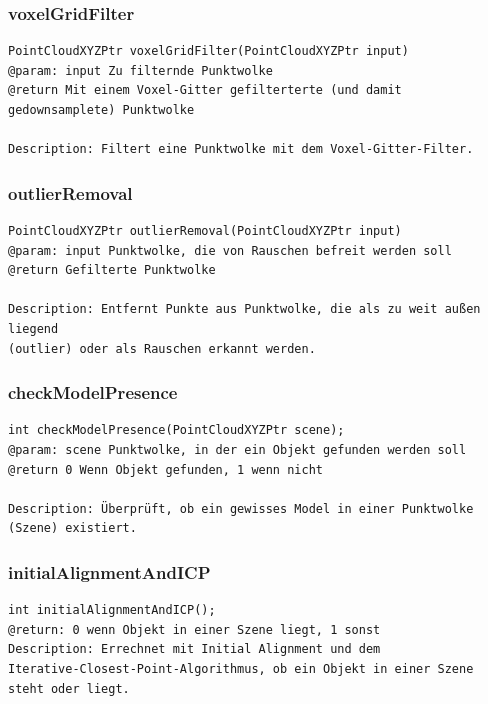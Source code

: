 \documentclass{suturo}
\begin{document}
\subsubsection{voxelGridFilter}
\begin{verbatim}
PointCloudXYZPtr voxelGridFilter(PointCloudXYZPtr input)
@param: input Zu filternde Punktwolke
@return Mit einem Voxel-Gitter gefilterterte (und damit gedownsamplete) Punktwolke

Description: Filtert eine Punktwolke mit dem Voxel-Gitter-Filter.
\end{verbatim}\label{func:voxelgridfilter}

\subsubsection{outlierRemoval}
\begin{verbatim}
PointCloudXYZPtr outlierRemoval(PointCloudXYZPtr input)
@param: input Punktwolke, die von Rauschen befreit werden soll
@return Gefilterte Punktwolke

Description: Entfernt Punkte aus Punktwolke, die als zu weit außen liegend
(outlier) oder als Rauschen erkannt werden.
\end{verbatim}\label{func:outlierremoval}

\subsubsection{checkModelPresence}
\begin{verbatim}
int checkModelPresence(PointCloudXYZPtr scene);
@param: scene Punktwolke, in der ein Objekt gefunden werden soll
@return 0 Wenn Objekt gefunden, 1 wenn nicht

Description: Überprüft, ob ein gewisses Model in einer Punktwolke (Szene) existiert.
\end{verbatim}\label{func:checkmodelpresence}

\subsubsection{initialAlignmentAndICP}
\begin{verbatim}
int initialAlignmentAndICP();
@return: 0 wenn Objekt in einer Szene liegt, 1 sonst
Description: Errechnet mit Initial Alignment und dem
Iterative-Closest-Point-Algorithmus, ob ein Objekt in einer Szene steht oder liegt.
\end{verbatim}\label{func:initialalignmentandicp}
\end{document}

